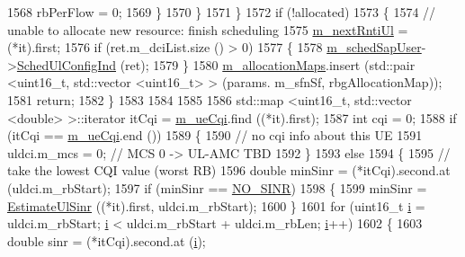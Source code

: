 \begin{DoxyCode}
1568                   rbPerFlow = 0;                 
1569                 \}
1570             \}
1571         \}
1572       \textcolor{keywordflow}{if} (!allocated)
1573         \{
1574           \textcolor{comment}{// unable to allocate new resource: finish scheduling}
1575           \hyperlink{classns3_1_1TdBetFfMacScheduler_affbc3b6450778e77fbc0e20cb575d1b0}{m\_nextRntiUl} = (*it).first;
1576           \textcolor{keywordflow}{if} (ret.m\_dciList.size () > 0)
1577             \{
1578               \hyperlink{classns3_1_1TdBetFfMacScheduler_aac1731b516e0a6e45d76828f6c72eaa5}{m\_schedSapUser}->\hyperlink{classns3_1_1FfMacSchedSapUser_a1b89636256701a84d990db7db8aea874}{SchedUlConfigInd} (ret);
1579             \}
1580           \hyperlink{classns3_1_1TdBetFfMacScheduler_a058a5b7d1c7c507d3fe3d9d12cc24ab7}{m\_allocationMaps}.insert (std::pair <uint16\_t, std::vector <uint16\_t> > (params.
      m\_sfnSf, rbgAllocationMap));
1581           \textcolor{keywordflow}{return};
1582         \}
1583 
1584 
1585 
1586       std::map <uint16\_t, std::vector <double> >::iterator itCqi = \hyperlink{classns3_1_1TdBetFfMacScheduler_a869067679aa0a846212a1fb509c1d702}{m\_ueCqi}.find ((*it).first);
1587       \textcolor{keywordtype}{int} cqi = 0;
1588       \textcolor{keywordflow}{if} (itCqi == \hyperlink{classns3_1_1TdBetFfMacScheduler_a869067679aa0a846212a1fb509c1d702}{m\_ueCqi}.end ())
1589         \{
1590           \textcolor{comment}{// no cqi info about this UE}
1591           uldci.m\_mcs = 0; \textcolor{comment}{// MCS 0 -> UL-AMC TBD}
1592         \}
1593       \textcolor{keywordflow}{else}
1594         \{
1595           \textcolor{comment}{// take the lowest CQI value (worst RB)}
1596           \textcolor{keywordtype}{double} minSinr = (*itCqi).second.at (uldci.m\_rbStart);
1597           \textcolor{keywordflow}{if} (minSinr == \hyperlink{cqa-ff-mac-scheduler_8h_a520d71777be043568160c783a9c65fd5}{NO\_SINR})
1598             \{
1599               minSinr = \hyperlink{classns3_1_1TdBetFfMacScheduler_a051dacc13beec936c3e5206d865837bc}{EstimateUlSinr} ((*it).first, uldci.m\_rbStart);
1600             \}
1601           \textcolor{keywordflow}{for} (uint16\_t \hyperlink{bernuolliDistribution_8m_a6f6ccfcf58b31cb6412107d9d5281426}{i} = uldci.m\_rbStart; \hyperlink{bernuolliDistribution_8m_a6f6ccfcf58b31cb6412107d9d5281426}{i} < uldci.m\_rbStart + uldci.m\_rbLen; 
      \hyperlink{bernuolliDistribution_8m_a6f6ccfcf58b31cb6412107d9d5281426}{i}++)
1602             \{
1603               \textcolor{keywordtype}{double} sinr = (*itCqi).second.at (\hyperlink{bernuolliDistribution_8m_a6f6ccfcf58b31cb6412107d9d5281426}{i});

\end{DoxyCode}
